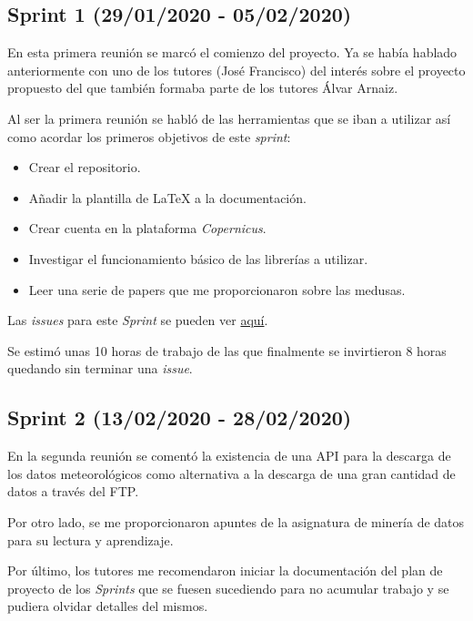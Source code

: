 
\subsection{Sprint 1 (29/01/2020 - 05/02/2020)}\label{Sprint-1}
En esta primera reunión se marcó el comienzo del proyecto. Ya se había hablado anteriormente con uno de los tutores (José Francisco) del interés sobre el proyecto propuesto del que también formaba parte de los tutores Álvar Arnaiz.

Al ser la primera reunión se habló de las herramientas que se iban a utilizar así como acordar los primeros objetivos de este \emph{sprint}:

\begin{itemize}
\item Crear el repositorio.
\item Añadir la plantilla de \LaTeX{} a la documentación.
\item Crear cuenta en la plataforma \emph{Copernicus}.
\item Investigar el funcionamiento básico de las librerías a utilizar.
\item Leer una serie de papers que me proporcionaron sobre las medusas.
\end{itemize}

Las \emph{issues} para este \emph{Sprint} se pueden ver \href{https://github.com/psnti/TFG-Pablo-Santidrian-Tudanca/milestone/1}{aquí}.

Se estimó unas 10 horas de trabajo de las que finalmente se invirtieron 8 horas quedando sin terminar una \emph{issue}.


\subsection{Sprint 2 (13/02/2020 - 28/02/2020)}\label{Sprint-2}

En la segunda reunión se comentó la existencia de una API para la descarga de los datos meteorológicos como alternativa a la descarga de una gran cantidad de datos a través del FTP.

Por otro lado, se me proporcionaron apuntes de la asignatura de minería de datos para su lectura y aprendizaje.

Por último, los tutores me recomendaron iniciar la documentación del plan de proyecto de los \emph{Sprints} que se fuesen sucediendo para no acumular trabajo y se pudiera olvidar detalles del mismos.

